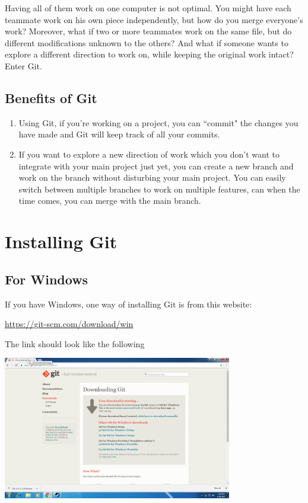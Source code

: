 \documentclass[12pt]{report}
\begin{document}
Having all of them work on one computer is not optimal. You might have each teammate work on his own piece independently, but how do you merge everyone's work? Moreover, what if two or more teammates work on the same file, but do different modifications unknown to the others? And what if someone wants to explore a different direction to work on, while keeping the original work intact? Enter Git.

\section{Benefits of Git}
\begin{enumerate}
  \item Using Git, if you're working on a project, you can ``commit" the changes you have made and Git will keep track of all your commits. 
  
  \item If you want to explore a new direction of work which you don't want to integrate with your main project just yet, you can create a new branch and work on the branch without disturbing your main project. You can easily switch between multiple branches to work on multiple features, can when the time comes, you can merge with the main branch. 
\end{enumerate}

\chapter{Installing Git}

\section{For Windows}
If you have Windows, one way of installing Git is from this website:

\url{https://git-scm.com/download/win}

The link should look like the following

\includegraphics[width=0.75\textwidth]{windows-download.png}
\end{document}
